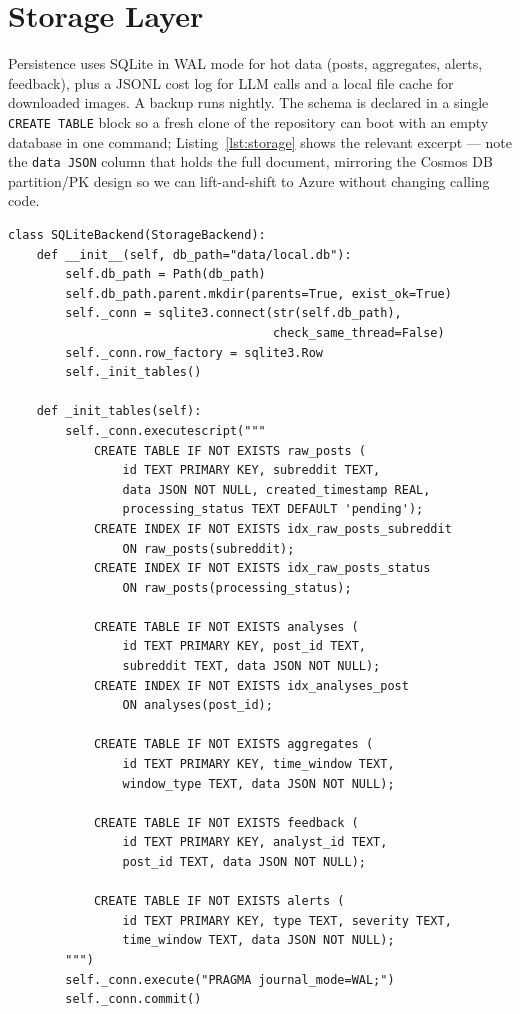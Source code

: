 \section{Storage Layer}\label{sec:storage}
Persistence uses SQLite in WAL mode for hot data (posts, aggregates,
alerts, feedback), plus a JSONL cost log for LLM calls and a local file
cache for downloaded images.  A backup runs nightly.  The schema is
declared in a single \texttt{CREATE TABLE} block so a fresh clone of the
repository can boot with an empty database in one command;
Listing~\ref{lst:storage} shows the relevant excerpt --- note the
\texttt{data JSON} column that holds the full document, mirroring the
Cosmos DB partition/PK design so we can lift-and-shift to Azure
without changing calling code.

\begin{lstlisting}[caption={SQLite schema mirroring the Cosmos DB partition design ({\tt src/storage/store.py}).},label={lst:storage}]
class SQLiteBackend(StorageBackend):
    def __init__(self, db_path="data/local.db"):
        self.db_path = Path(db_path)
        self.db_path.parent.mkdir(parents=True, exist_ok=True)
        self._conn = sqlite3.connect(str(self.db_path),
                                     check_same_thread=False)
        self._conn.row_factory = sqlite3.Row
        self._init_tables()

    def _init_tables(self):
        self._conn.executescript("""
            CREATE TABLE IF NOT EXISTS raw_posts (
                id TEXT PRIMARY KEY, subreddit TEXT,
                data JSON NOT NULL, created_timestamp REAL,
                processing_status TEXT DEFAULT 'pending');
            CREATE INDEX IF NOT EXISTS idx_raw_posts_subreddit
                ON raw_posts(subreddit);
            CREATE INDEX IF NOT EXISTS idx_raw_posts_status
                ON raw_posts(processing_status);

            CREATE TABLE IF NOT EXISTS analyses (
                id TEXT PRIMARY KEY, post_id TEXT,
                subreddit TEXT, data JSON NOT NULL);
            CREATE INDEX IF NOT EXISTS idx_analyses_post
                ON analyses(post_id);

            CREATE TABLE IF NOT EXISTS aggregates (
                id TEXT PRIMARY KEY, time_window TEXT,
                window_type TEXT, data JSON NOT NULL);

            CREATE TABLE IF NOT EXISTS feedback (
                id TEXT PRIMARY KEY, analyst_id TEXT,
                post_id TEXT, data JSON NOT NULL);

            CREATE TABLE IF NOT EXISTS alerts (
                id TEXT PRIMARY KEY, type TEXT, severity TEXT,
                time_window TEXT, data JSON NOT NULL);
        """)
        self._conn.execute("PRAGMA journal_mode=WAL;")
        self._conn.commit()
\end{lstlisting}
